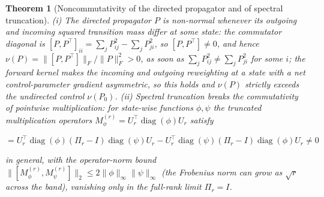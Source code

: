 \documentclass[aps,prresearch,reprint,amsmath,amssymb,nofootinbib,superscriptaddress,floatfix]{revtex4-2}
\newtheorem{theorem}{Theorem}
\theoremstyle{definition}
\theoremstyle{remark}
\theoremstyle{plain}
\begin{document}
\begin{theorem}[Noncommutativity of the directed propagator and of spectral truncation]
\label{thm:noncomm}
(i) The directed propagator $P$ is non-normal whenever its outgoing and incoming squared transition mass
differ at some state: the commutator diagonal is $[P,P^\top]_{ii}=\sum_j P_{ij}^2-\sum_j P_{ji}^2$, so
$[P,P^\top]\neq0$, and hence $\nu(P)=\|[P,P^\top]\|_F/\|P\|_F^2>0$, as soon as $\sum_j P_{ij}^2\neq\sum_j
P_{ji}^2$ for some $i$; the forward kernel makes the incoming and outgoing reweighting at a state with a
net control-parameter gradient asymmetric, so this holds and $\nu(P)$ strictly exceeds the undirected
control $\nu(P_0)$.
(ii) Spectral truncation breaks the commutativity of pointwise multiplication: for state-wise functions
$\phi,\psi$ the truncated multiplication operators $M_\phi^{(r)}=U_r^\top\!\operatorname{diag}(\phi)U_r$
satisfy
\begin{widetext}
\begin{equation}
[M_\phi^{(r)},M_\psi^{(r)}]=U_r^\top\operatorname{diag}(\phi)(\Pi_r-I)\operatorname{diag}(\psi)U_r
-U_r^\top\operatorname{diag}(\psi)(\Pi_r-I)\operatorname{diag}(\phi)U_r\neq0
\label{eq:commutator}
\end{equation}
\end{widetext}
in general, with the operator-norm bound $\|[M_\phi^{(r)},M_\psi^{(r)}]\|_2\le 2\|\phi\|_\infty
\|\psi\|_\infty$ (the Frobenius norm can grow as $\sqrt{r}$ across the band), vanishing only in the
full-rank limit $\Pi_r=I$.
\end{theorem}
\end{document}
